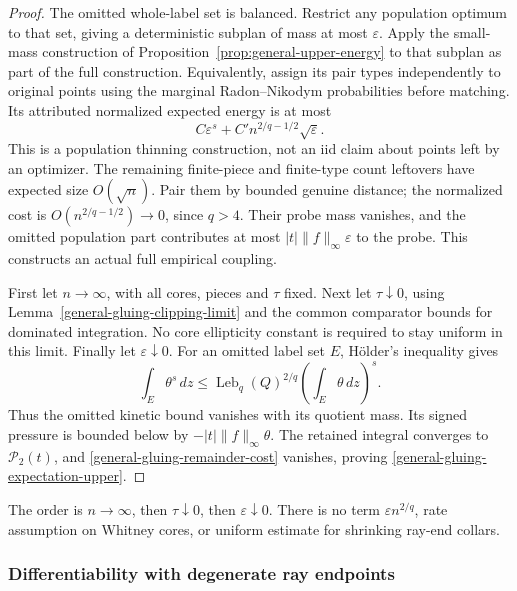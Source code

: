 \documentclass[11pt,reqno]{amsart}
\theoremstyle{definition}
\theoremstyle{remark}
\numberwithin{equation}{section}
\begin{document}
\begin{proof}
The omitted whole-label set is balanced. Restrict any population optimum
to that set, giving a deterministic subplan of mass at most
\(\varepsilon\). Apply the small-mass construction of
Proposition~\ref{prop:general-upper-energy} to that subplan as part of the
full construction. Equivalently, assign its pair types independently to
original points using the marginal Radon--Nikodym probabilities before
matching. Its attributed normalized expected energy is at most
\begin{equation}
\label{general-gluing-remainder-cost}
 C\varepsilon^s+C'n^{2/q-1/2}\sqrt\varepsilon.
\end{equation}
This is a population thinning construction, not an iid claim about points
left by an optimizer. The remaining finite-piece and finite-type count
leftovers have expected size \(O(\sqrt n)\). Pair them by bounded genuine
distance; the normalized cost is \(O(n^{2/q-1/2})\to0\), since \(q>4\).
Their probe mass vanishes, and the omitted population part contributes at
most \(|t|\|f\|_\infty\varepsilon\) to the probe. This constructs an
actual full empirical coupling.

First let \(n\to\infty\), with all cores, pieces and \(\tau\) fixed.
Next let \(\tau\downarrow0\), using
Lemma~\ref{general-gluing-clipping-limit} and the common comparator bounds
for dominated integration. No core ellipticity constant is required to
stay uniform in this limit. Finally let \(\varepsilon\downarrow0\).
For an omitted label set \(E\), H\"older's inequality gives
\begin{equation}
\label{general-gluing-small-label-integral}
 \int_E\theta^s\,dz
 \le\operatorname{Leb}_q(Q)^{2/q}
                  \left(\int_E\theta\,dz\right)^s.
\end{equation}
Thus the omitted kinetic bound vanishes with its quotient mass. Its
signed pressure is bounded below by
\(-|t|\|f\|_\infty\theta\). The retained integral converges to
\(\mathcal P_2(t)\), and \eqref{general-gluing-remainder-cost} vanishes,
proving \eqref{general-gluing-expectation-upper}.
\end{proof}

The order is \(n\to\infty\), then \(\tau\downarrow0\), then
\(\varepsilon\downarrow0\). There is no term
\(\varepsilon n^{2/q}\), rate assumption on Whitney cores, or uniform
estimate for shrinking ray-end collars.

\subsubsection{Differentiability with degenerate ray endpoints}
\label{degenerate-scalar-section}
\end{document}
